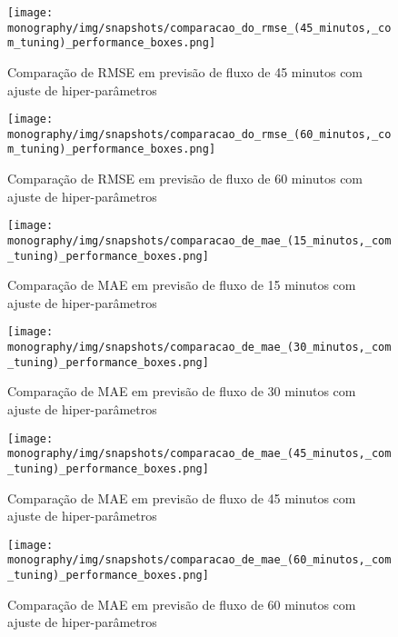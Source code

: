 \begin{figure}[htbp]
    \centering
    \texttt{[image: monography/img/snapshots/comparacao\_do\_rmse\_(45\_minutos,\_com\_tuning)\_performance\_boxes.png]}
    \label{figure:comparacao_previsao_rmse_45_com_tuning}
    \caption{Comparação de RMSE em previsão de fluxo de 45 minutos com ajuste de hiper-parâmetros}
\end{figure}

\begin{figure}[htbp]
    \centering
    \texttt{[image: monography/img/snapshots/comparacao\_do\_rmse\_(60\_minutos,\_com\_tuning)\_performance\_boxes.png]}
    \label{figure:comparacao_previsao_rmse_60_com_tuning}
    \caption{Comparação de RMSE em previsão de fluxo de 60 minutos com ajuste de hiper-parâmetros}
\end{figure}

\begin{figure}[htbp]
    \centering
    \texttt{[image: monography/img/snapshots/comparacao\_de\_mae\_(15\_minutos,\_com\_tuning)\_performance\_boxes.png]}
    \label{figure:comparacao_previsao_mae_15_com_tuning}
    \caption{Comparação de MAE em previsão de fluxo de 15 minutos com ajuste de hiper-parâmetros}
\end{figure}

\begin{figure}[htbp]
    \centering
    \texttt{[image: monography/img/snapshots/comparacao\_de\_mae\_(30\_minutos,\_com\_tuning)\_performance\_boxes.png]}
    \label{figure:comparacao_previsao_mae_30_com_tuning}
    \caption{Comparação de MAE em previsão de fluxo de 30 minutos com ajuste de hiper-parâmetros}
\end{figure}

\begin{figure}[htbp]
    \centering
    \texttt{[image: monography/img/snapshots/comparacao\_de\_mae\_(45\_minutos,\_com\_tuning)\_performance\_boxes.png]}
    \label{figure:comparacao_previsao_mae_45_com_tuning}
    \caption{Comparação de MAE em previsão de fluxo de 45 minutos com ajuste de hiper-parâmetros}
\end{figure}

\begin{figure}[htbp]
    \centering
    \texttt{[image: monography/img/snapshots/comparacao\_de\_mae\_(60\_minutos,\_com\_tuning)\_performance\_boxes.png]}
    \label{figure:comparacao_previsao_mae_60_com_tuning}
    \caption{Comparação de MAE em previsão de fluxo de 60 minutos com ajuste de hiper-parâmetros}
\end{figure}

